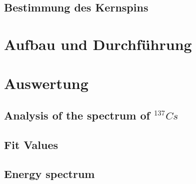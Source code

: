 \documentclass[bigchapter,colorback,accentcolor=tud4b,linedtoc,11pt]{tudreport}
\begin{document}
\section{Bestimmung des Kernspins}

\chapter{Aufbau und Durchführung}


\chapter{Auswertung}

\section{Analysis of the spectrum of $^{137}Cs$}


\section{Fit Values}


\section{Energy spectrum}
\end{document}
